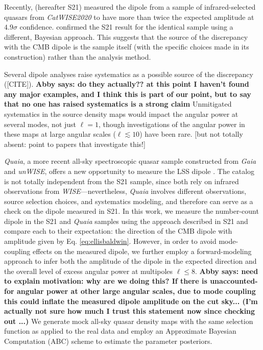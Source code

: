 \documentclass[modern]{aastex631}
\newcommand{\abby}[1]{\textbf{Abby says: #1}}
\newcommand{\catwisetwentytwenty}{\textsl{CatWISE2020}\xspace}
\newcommand{\quaia}{\textsl{Quaia}\xspace}
\newcommand{\gaia}{\textsl{Gaia}\xspace}
\newcommand{\unwise}{\textsl{unWISE}\xspace}
\begin{document}
Recently, \citet{secrest_test_2021} (hereafter S21) measured the dipole from a sample of infrared-selected quasars from \catwisetwentytwenty to have more than twice the expected amplitude at $4.9\sigma$ confidence.
\citet{dam_testing_2022} confirmed the S21 result for the identical sample using a different, Bayesian approach.
This suggests that the source of the discrepancy with the CMB dipole is the sample itself (with the specific choices made in its construction) rather than the analysis method.

Several dipole analyses raise systematics as a possible source of the discrepancy ([CITE]).
\abby{do they actually?? at this point I haven't found any major examples, and I think this is part of our point, but to say that no one has raised systematics is a strong claim}
Unmitigated systematics in the source density maps would impact the angular power at several modes, not just $\ell=1$, though investigations of the angular power in these maps at large angular scales ($\ell\lesssim 10$) have been rare.
[but not totally absent: point to papers that investigate this!]

\quaia, a more recent all-sky spectroscopic quasar sample constructed from \gaia and \unwise, offers a new opportunity to measure the LSS dipole \citep{storey-fisher_quaia_2023}.
The catalog is not totally independent from the S21 sample, since both rely on infrared observations from \textit{WISE}—nevertheless, \quaia involves different observations, source selection choices, and systematics modeling, and therefore can serve as a check on the dipole measured in S21.
In this work, we measure the number-count dipole in the S21 and \quaia samples using the approach described in S21 and compare each to their expectation: the direction of the CMB dipole with amplitude given by Eq. \ref{eq:ellisbaldwin}.
However, in order to avoid mode-coupling effects on the measured dipole, we further employ a forward-modeling approach to infer both the amplitude of the dipole in the expected direction and the overall level of excess angular power at multipoles $\ell\le 8$.
\abby{need to explain motivation: why are we doing this? If there is unaccounted-for angular power at other large angular scales, due to mode coupling this could inflate the measured dipole amplitude on the cut sky... (I'm actually not sure how much I trust this statement now since checking out \citet{oayda_cosmic_2024}...)}
We generate mock all-sky quasar density maps with the same selection function as applied to the real data and employ an Approximate Bayesian Computation (ABC) scheme to estimate the parameter posteriors.
\end{document}
